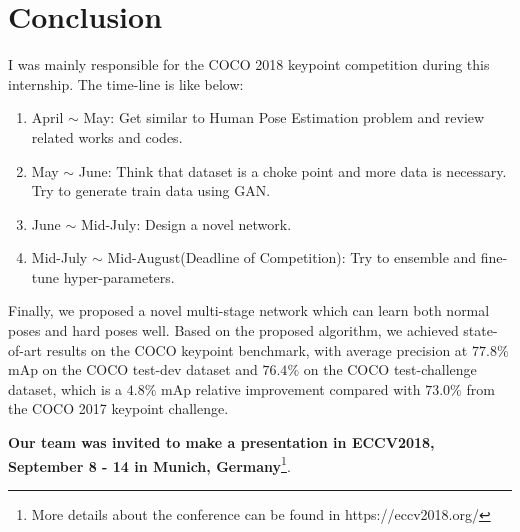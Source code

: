 \chapter{Conclusion}
I was mainly responsible for the COCO 2018 keypoint competition during this internship.
The time-line is like below:
\begin{enumerate}
  \item April $\sim$ May: Get similar to Human Pose Estimation problem and review related works and codes.
  \item May $\sim$ June: Think that dataset is a choke point and more data is necessary. Try to generate train data using GAN\cite{goodfellow2014generative}.
  \item June $\sim$ Mid-July: Design a novel network.
  \item Mid-July $\sim$ Mid-August(Deadline of Competition): Try to ensemble and fine-tune hyper-parameters.
\end{enumerate}

Finally, we proposed a novel multi-stage network which can learn both normal poses and hard poses well.
Based on the proposed algorithm, we achieved state-of-art results on the COCO keypoint benchmark, with average
precision at $77.8\%$ mAp on the COCO test-dev dataset and $76.4\%$ on the COCO test-challenge dataset, which is a $4.8\%$ mAp
relative improvement compared with $73.0\%$ from the COCO 2017 keypoint challenge.

\textbf{Our team was invited to make a presentation in ECCV2018, September 8 - 14 in Munich, Germany}\footnote{More details about the conference can be found in https://eccv2018.org/}.

